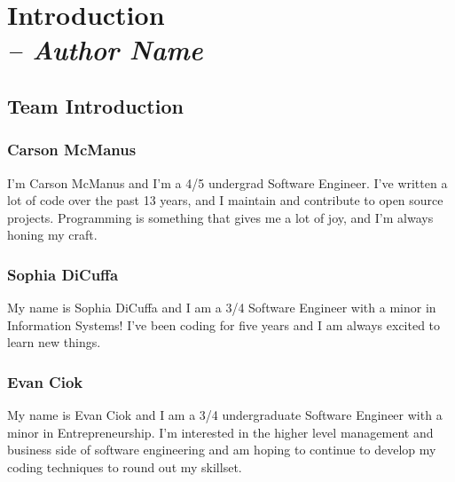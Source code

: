 \chapter{Introduction \\
  \small{\textit{-- Author Name}}
  \label{Chapter::Introduction}}

\section{Team Introduction \label{Section::TeamIntroduction}}

\subsection{Carson McManus}

I'm Carson McManus and I'm a 4/5 undergrad Software Engineer. I've written a lot of code over the past 13 years, and I maintain and contribute to open source projects. Programming is something that gives me a lot of joy, and I'm always honing my craft.

\subsection{Sophia DiCuffa}

My name is Sophia DiCuffa and I am a 3/4 Software Engineer with a minor in Information Systems! I've been coding for five years and I am always excited to learn new things.

\subsection{Evan Ciok}

My name is Evan Ciok and I am a 3/4 undergraduate Software Engineer with a minor in Entrepreneurship. I'm interested in the higher level management and business side of software engineering and am hoping to continue to develop my coding techniques to round out my skillset. 